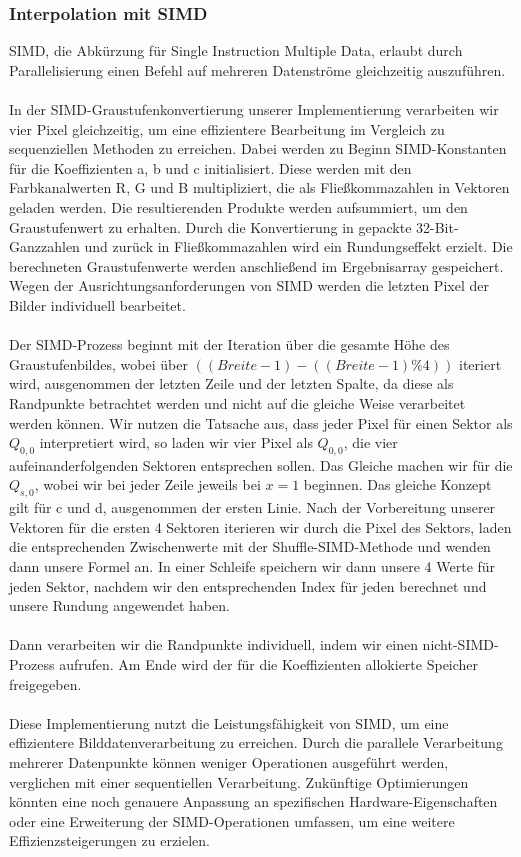 \documentclass[course=erap]{aspdoc}
\begin{document}
\subsubsection{Interpolation mit SIMD}
SIMD, die Abkürzung für Single Instruction Multiple Data, erlaubt durch Parallelisierung einen Befehl auf mehreren Datenströme gleichzeitig auszuführen.\\\\
In der SIMD-Graustufenkonvertierung unserer Implementierung verarbeiten wir vier Pixel gleichzeitig, um eine effizientere Bearbeitung im Vergleich zu sequenziellen Methoden zu erreichen. Dabei werden zu Beginn SIMD-Konstanten für die Koeffizienten a, b und c initialisiert. Diese werden mit den Farbkanalwerten R, G und B multipliziert, die als Fließkommazahlen in Vektoren geladen werden. Die resultierenden Produkte werden aufsummiert, um den Graustufenwert zu erhalten. Durch die Konvertierung in gepackte 32-Bit-Ganzzahlen und zurück in Fließkommazahlen wird ein Rundungseffekt erzielt. Die berechneten Graustufenwerte werden anschließend im Ergebnisarray gespeichert. Wegen der Ausrichtungsanforderungen von SIMD werden die letzten Pixel der Bilder individuell bearbeitet.\\\\
Der SIMD-Prozess beginnt mit der Iteration über die gesamte Höhe des Graustufenbildes, wobei über $((Breite-1)-((Breite-1)\%4))$ iteriert wird, ausgenommen der letzten Zeile und der letzten Spalte, da diese als Randpunkte betrachtet werden und nicht auf die gleiche Weise verarbeitet werden können. Wir nutzen die Tatsache aus, dass jeder Pixel für einen Sektor als $Q_{0,0}$ interpretiert wird, so laden wir vier Pixel als $Q_{0,0}$, die vier aufeinanderfolgenden Sektoren entsprechen sollen. Das Gleiche machen wir für die $Q_{s,0}$, wobei wir bei jeder Zeile jeweils bei $x=1$ beginnen. Das gleiche Konzept gilt für c und d, ausgenommen der ersten Linie. Nach der Vorbereitung unserer Vektoren für die ersten 4 Sektoren iterieren wir durch die Pixel des Sektors, laden die entsprechenden Zwischenwerte mit der Shuffle-SIMD-Methode und wenden dann unsere Formel an. In einer Schleife speichern wir dann unsere 4 Werte für jeden Sektor, nachdem wir den entsprechenden Index für jeden berechnet und unsere Rundung angewendet haben.\\\\
Dann verarbeiten wir die Randpunkte individuell, indem wir einen nicht-SIMD-Prozess aufrufen. Am Ende wird der für die Koeffizienten allokierte Speicher freigegeben.\\\\
Diese Implementierung nutzt die Leistungsfähigkeit von SIMD, um eine effizientere Bilddatenverarbeitung zu erreichen. Durch die parallele Verarbeitung mehrerer Datenpunkte können weniger Operationen ausgeführt werden, verglichen mit einer sequentiellen Verarbeitung. Zukünftige Optimierungen könnten eine noch genauere Anpassung an spezifischen Hardware-Eigenschaften oder eine Erweiterung der SIMD-Operationen umfassen, um eine weitere Effizienzsteigerungen zu erzielen.
\end{document}
